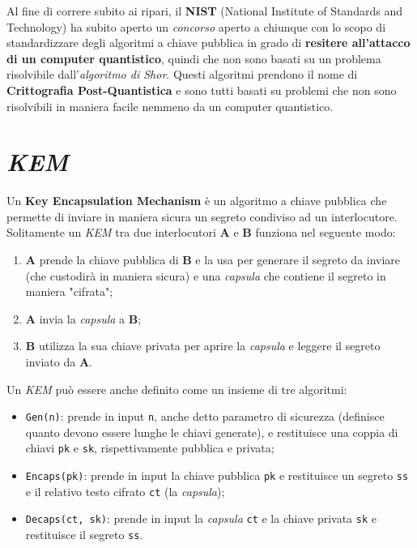 Al fine di correre subito ai ripari, il \textbf{NIST} (National Institute of Standards and Technology) ha subito aperto un \emph{concorso} aperto a chiunque con lo scopo di standardizzare degli algoritmi a chiave pubblica in grado di \textbf{resitere all'attacco di un computer quantistico}, quindi che non sono basati su un problema risolvibile dall'\emph{algoritmo di Shor}. Questi algoritmi prendono il nome di \textbf{Crittografia Post-Quantistica} e sono tutti basati su problemi che non sono risolvibili in maniera facile nemmeno da un computer quantistico. \cite{wikipedia_quantum_computing}


\section{\emph{KEM}}
Un \textbf{Key Encapsulation Mechanism} è un algoritmo a chiave pubblica che permette di inviare in maniera sicura un segreto condiviso ad un interlocutore. Solitamente un \emph{KEM} tra due interlocutori \textbf{A} e \textbf{B} funziona nel seguente modo:
\begin{enumerate}
    \item \textbf{A} prende la chiave pubblica di \textbf{B} e la usa per generare il segreto da inviare (che custodirà in maniera sicura) e una \emph{capsula} che contiene il segreto in maniera "cifrata";
    \item \textbf{A} invia la \emph{capsula} a \textbf{B};
    \item \textbf{B} utilizza la sua chiave privata per aprire la \emph{capsula} e leggere il segreto inviato da \textbf{A}.
\end{enumerate}

Un \emph{KEM} può essere anche definito come un insieme di tre algoritmi:
\begin{itemize}
    \item \texttt{Gen(n)}: prende in input \texttt{n}, anche detto parametro di sicurezza (definisce quanto devono essere lunghe le chiavi generate), e restituisce una coppia di chiavi \texttt{pk} e \texttt{sk}, rispettivamente pubblica e privata;
    \item \texttt{Encaps(pk)}: prende in input la chiave pubblica \texttt{pk} e restituisce un segreto \texttt{ss} e il relativo testo cifrato \texttt{ct} (la \emph{capsula});
    \item \texttt{Decaps(ct, sk)}: prende in input la \emph{capsula} \texttt{ct} e la chiave privata \texttt{sk} e restituisce il segreto \texttt{ss}.
\end{itemize}

